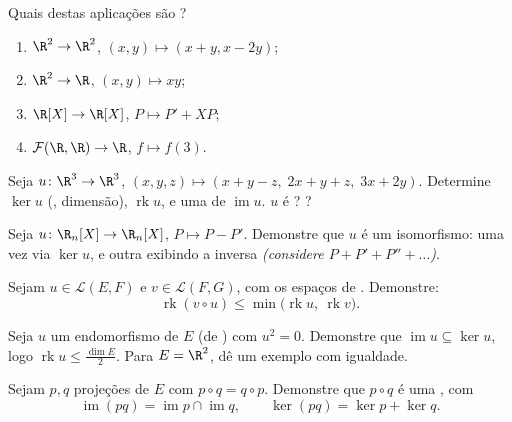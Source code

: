 \begin{exercise}[$\star$]\label{exo:b1:linmaps:1}
Quais destas aplicações são ?
\begin{enumerate}
  \item $\R^2 \to \R^2$, $(x, y) \mapsto (x + y, x - 2y)$;
  \item $\R^2 \to \R$, $(x, y) \mapsto xy$;
  \item $\R[X] \to \R[X]$, $P \mapsto P' + XP$;
  \item $\mathcal{F}(\R,\R) \to \R$, $f \mapsto f(3)$.
\end{enumerate}
\end{exercise}

\begin{exercise}[$\star$]\label{exo:b1:linmaps:2}
Seja $u \colon \R^3 \to \R^3$, $(x,y,z) \mapsto (x + y - z,\; 2x + y
+ z,\; 3x + 2y)$. Determine $\ker u$ (, dimensão), $\operatorname{rk} u$, e
uma  de $\operatorname{im} u$. $u$ é ? ?
\end{exercise}

\begin{exercise}[$\star$]\label{exo:b1:linmaps:3}
Seja $u \colon \R_n[X] \to \R_n[X]$, $P \mapsto P - P'$. Demonstre que $u$ é um isomorfismo: uma vez via
$\ker u$, e outra exibindo a inversa \emph{(considere $P + P' + P'' + \dots$)}.
\end{exercise}

\begin{exercise}[$\star$]\label{exo:b1:linmaps:4}
Sejam $u \in \mathcal{L}(E, F)$ e $v \in \mathcal{L}(F, G)$, com os espaços de . Demonstre:
\[
\operatorname{rk}(v \circ u) \leq
\min\bigl(\operatorname{rk} u,\ \operatorname{rk} v\bigr).
\]
\end{exercise}

\begin{exercise}[$\star\star$]\label{exo:b1:linmaps:5}
Seja $u$ um endomorfismo de $E$ (de ) com $u^2 = 0$.
Demonstre que $\operatorname{im} u \subseteq \ker u$, logo $\operatorname{rk} u \leq \frac{\dim E}{2}$. Para $E = \R^2$, dê um exemplo com
igualdade.
\end{exercise}

\begin{exercise}[$\star\star$]\label{exo:b1:linmaps:6}
Sejam $p, q$ projeções de $E$ com $p \circ q = q \circ p$. Demonstre que $p \circ q$ é uma
, com
\[
\operatorname{im}(pq) = \operatorname{im} p \cap \operatorname{im}
q ,
\qquad
\ker (pq) = \ker p + \ker q .
\]
\end{exercise}

